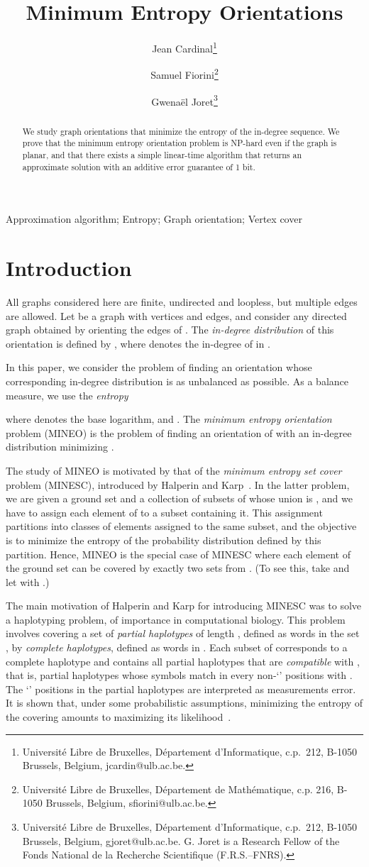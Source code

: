 \documentclass[11pt]{article}
\title{Minimum Entropy Orientations}
\author{
Jean Cardinal\thanks{Universit\'e Libre de Bruxelles, D\'epartement d'Informatique, c.p.~212, B-1050 Brussels, Belgium, jcardin@ulb.ac.be.}
 \and 
Samuel Fiorini\thanks{Universit\'e Libre de Bruxelles, D\'epartement de Math\'ematique, c.p. 216,  B-1050 Brussels, Belgium,  sfiorini@ulb.ac.be.}
\and 
Gwena\"el Joret\thanks{Universit\'e Libre de Bruxelles, D\'epartement d'Informatique, c.p.~212,  B-1050 Brussels, Belgium, gjoret@ulb.ac.be. G. Joret is a Research Fellow of the Fonds 
National de la Recherche Scientifique (F.R.S.--FNRS).}
}
\date{}
\begin{document}
\sloppy

\maketitle

\begin{abstract}
We study graph orientations that minimize the entropy of the in-degree sequence. We prove that the minimum entropy orientation problem is NP-hard even if the graph is planar, and that there exists a simple linear-time algorithm that returns an approximate solution with an additive error guarantee of 1 bit. 
\end{abstract}

{
Approximation algorithm; Entropy; Graph orientation; Vertex cover 
}

\section{Introduction}

All graphs considered here are finite, undirected and loopless, but multiple edges are allowed. Let  be a graph with  vertices and  edges, and consider any directed graph  obtained by orienting the edges of . The {\em in-degree distribution}  of this orientation is defined by , where  denotes the in-degree of  in .

In this paper, we consider the problem of finding an orientation whose corresponding in-degree distribution is as unbalanced as possible. As a balance measure, we use the {\em entropy}

where  denotes the base  logarithm, and . The {\em minimum entropy orientation} problem (MINEO) is the problem of finding an orientation of  with an in-degree distribution  minimizing .

The study of MINEO is motivated by that of the {\em minimum entropy set cover} problem (MINESC), introduced by Halperin and Karp~\cite{HK05}. In the latter problem, we are given a ground set  and a collection  of subsets of  whose union is , and we have to assign each element of  to a subset  containing it. This assignment partitions  into classes  of elements assigned to the same subset, and the objective is to minimize the entropy of the probability distribution  
defined by this partition. Hence, MINEO is the special case of MINESC where each element of the ground set can be covered by exactly two sets from .
(To see this, take  and let  with .)

The main motivation of Halperin and Karp for introducing MINESC was to solve a haplotyping problem, of importance in computational biology. This problem involves covering a set  of {\em partial haplotypes} of length , defined as words in the set , by {\em complete haplotypes}, defined as words in . Each subset of  corresponds to a complete haplotype  and contains all partial haplotypes that are {\em compatible} with , that is, partial haplotypes whose symbols match in every non-`' positions with . The `' positions in the partial haplotypes are interpreted as measurements error. It is shown that, under some probabilistic assumptions, minimizing the entropy of the covering amounts to maximizing its likelihood~\cite{HK05}. 
\end{document}
